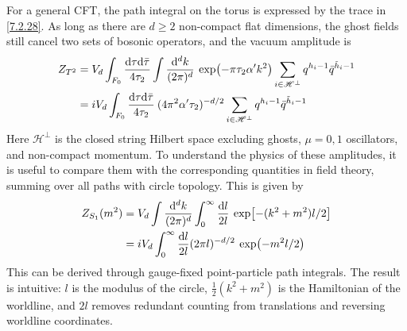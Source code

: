 For a general CFT, the path integral on the torus is expressed by the trace in \eqref{7.2.28}. 
As long as there are $d \geq 2$ non-compact flat dimensions, the ghost fields still cancel two sets of bosonic operators, and the vacuum amplitude is 
\begin{subequations} \label{7.3.8}
	\begin{align}
		Z_{T^{2}} &=V_{d} \int_{F_{0}} \frac{\mathrm{d} \tau \mathrm{d} \bar{\tau}}{4 \tau_{2}} \int \frac{\mathrm{d}^{d} k}{(2 \pi)^{d}}\: 
		\exp (-\pi \tau_{2} \alpha^{\prime} k^{2}) \sum_{i \in \mathscr{H}^{\perp}} q^{h_{i}-1} \bar{q}^{\tilde{h}_{i}-1} \label{7.3.8a}  \\
		&= i V_{d} \int_{F_{0}} \frac{\mathrm{d} \tau \mathrm{d} \bar{\tau}}{4 \tau_{2}} \: (4 \pi^{2} \alpha^{\prime} \tau_{2})^{-d / 2} 
		\sum_{i \in \mathscr{H}^{\perp}} q^{h_{i}-1} \bar{q}^{\tilde{h}_{i}-1}  \label{7.3.8b}
	\end{align}		
\end{subequations}
Here $\mathscr{H}^{\perp}$ is the closed string Hilbert space excluding ghosts, $\mu=0,1$ oscillators, and non-compact momentum. 
To understand the physics of these amplitudes, it is useful to compare them with the corresponding quantities in field theory, summing over all paths with circle topology. This is given by 
\begin{align}
	Z_{S_{1}}(m^{2}) &=V_{d} \int \frac{\mathrm{d}^{d} k}{(2 \pi)^{d}} \int_{0}^{\infty} \frac{\mathrm{d} l}{2 l}  \: 
	\exp [-(k^{2}+m^{2}) l / 2] \nonumber \\
	&=i V_{d} \int_{0}^{\infty} \frac{\mathrm{d} l}{2 l}(2 \pi l)^{-d / 2} \: \exp (-m^{2} l / 2)   \label{7.3.9} 
\end{align}
This can be derived through gauge-fixed point-particle path integrals. The result is intuitive: $l$ is the modulus of the circle, $\frac{1}{2}(k^{2}+m^{2})$ is the Hamiltonian of the worldline, and $2 l$ removes redundant counting from translations and reversing worldline coordinates. 

